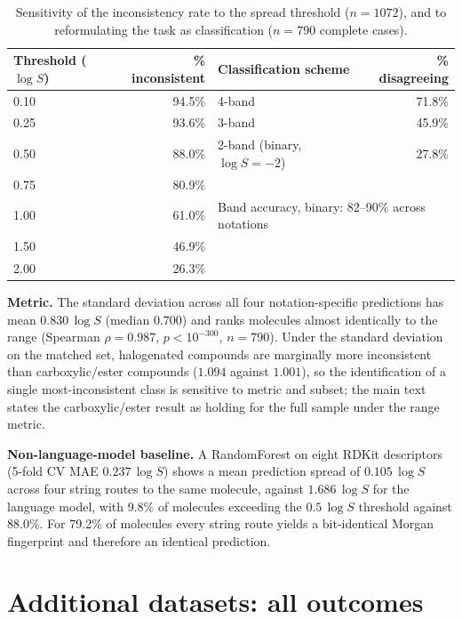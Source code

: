 \documentclass[11pt,a4paper]{article}
\newcommand{\logS}{\ensuremath{\log S}}
\begin{document}
\begin{table}[h]
\centering
\caption{Sensitivity of the inconsistency rate to the spread threshold ($n=1072$), and to
reformulating the task as classification ($n=790$ complete cases).}
\label{tab:robust}
\small
\begin{tabular}{lr@{\hskip 2cm}lr}
\toprule
Threshold ($\logS$) & \% inconsistent & Classification scheme & \% disagreeing \\
\midrule
0.10 & 94.5\% & 4-band & 71.8\% \\
0.25 & 93.6\% & 3-band & 45.9\% \\
0.50 & 88.0\% & 2-band (binary, $\logS=-2$) & 27.8\% \\
0.75 & 80.9\% & & \\
1.00 & 61.0\% & \multicolumn{2}{l}{Band accuracy, binary: 82--90\% across notations} \\
1.50 & 46.9\% & & \\
2.00 & 26.3\% & & \\
\bottomrule
\end{tabular}
\end{table}

\noindent \textbf{Metric.} The standard deviation across all four notation-specific predictions has
mean $0.830\,\logS$ (median $0.700$) and ranks molecules almost identically to the range
(Spearman $\rho = 0.987$, $p < 10^{-300}$, $n = 790$). Under the standard deviation on the matched
set, halogenated compounds are marginally more inconsistent than carboxylic/ester compounds
($1.094$ against $1.001$), so the identification of a single most-inconsistent class is sensitive to
metric and subset; the main text states the carboxylic/ester result as holding for the full sample
under the range metric.

\noindent \textbf{Non-language-model baseline.} A RandomForest on eight RDKit descriptors
(5-fold CV MAE $0.237\,\logS$) shows a mean prediction spread of $0.105\,\logS$ across four string
routes to the same molecule, against $1.686\,\logS$ for the language model, with 9.8\% of molecules
exceeding the $0.5\,\logS$ threshold against 88.0\%. For 79.2\% of molecules every string route
yields a bit-identical Morgan fingerprint and therefore an identical prediction.

\section{Additional datasets: all outcomes}
\end{document}
